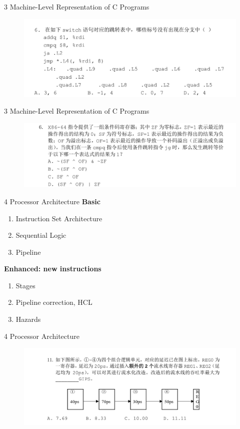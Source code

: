 \documentclass{beamer}
\begin{document}
\begin{frame}{3 Machine-Level Representation of C Programs}
	\begin{figure}
		\centering
		\includegraphics[width=1.0\textwidth]{figures/3-1.jpeg}
	\end{figure}
\end{frame}

\begin{frame}{3 Machine-Level Representation of C Programs}
	\begin{figure}
		\centering
		\includegraphics[width=1.0\textwidth]{figures/3-2.jpeg}
	\end{figure}
\end{frame}

\begin{frame}{4 Processor Architecture}
\textbf{Basic}
\begin{enumerate}
	\item Instruction Set Architecture
	\item Sequential Logic
	\item Pipeline
\end{enumerate}
\textbf{Enhanced: new instructions}
\begin{enumerate}
	\item Stages
	\item Pipeline correction, HCL
	\item Hazards
\end{enumerate}
\end{frame}

\begin{frame}{4 Processor Architecture}
	\begin{figure}
		\centering
		\includegraphics[width=1.0\textwidth]{figures/4-0.jpeg}
	\end{figure}
\end{frame}
\end{document}
